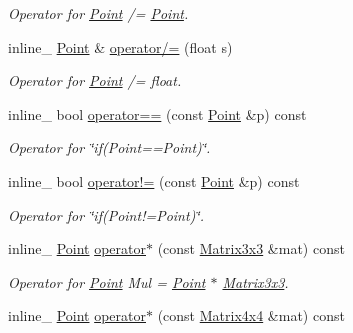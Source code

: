 \begin{DoxyCompactItemize}
\begin{DoxyCompactList}\small\item\em Operator for \hyperlink{classOpcode_1_1Point}{Point} /= \hyperlink{classOpcode_1_1Point}{Point}. \end{DoxyCompactList}\item 
inline\+\_\+ \hyperlink{classOpcode_1_1Point}{Point} \& \hyperlink{classOpcode_1_1Point_aedd8834fe4a31c357222a9d4d7bb98d9}{operator/=} (float s)\hypertarget{classOpcode_1_1Point_aedd8834fe4a31c357222a9d4d7bb98d9}{}\label{classOpcode_1_1Point_aedd8834fe4a31c357222a9d4d7bb98d9}

\begin{DoxyCompactList}\small\item\em Operator for \hyperlink{classOpcode_1_1Point}{Point} /= float. \end{DoxyCompactList}\item 
inline\+\_\+ bool \hyperlink{classOpcode_1_1Point_a58a4ef656e356333d2ffe0b18e836265}{operator==} (const \hyperlink{classOpcode_1_1Point}{Point} \&p) const \hypertarget{classOpcode_1_1Point_a58a4ef656e356333d2ffe0b18e836265}{}\label{classOpcode_1_1Point_a58a4ef656e356333d2ffe0b18e836265}

\begin{DoxyCompactList}\small\item\em Operator for \char`\"{}if(\+Point==\+Point)\char`\"{}. \end{DoxyCompactList}\item 
inline\+\_\+ bool \hyperlink{classOpcode_1_1Point_afd40a56c42541f9d67449cde0b659e8f}{operator!=} (const \hyperlink{classOpcode_1_1Point}{Point} \&p) const \hypertarget{classOpcode_1_1Point_afd40a56c42541f9d67449cde0b659e8f}{}\label{classOpcode_1_1Point_afd40a56c42541f9d67449cde0b659e8f}

\begin{DoxyCompactList}\small\item\em Operator for \char`\"{}if(\+Point!=\+Point)\char`\"{}. \end{DoxyCompactList}\item 
inline\+\_\+ \hyperlink{classOpcode_1_1Point}{Point} \hyperlink{classOpcode_1_1Point_aa945d324610c2bd6288ccad73dab90ca}{operator$\ast$} (const \hyperlink{classOpcode_1_1Matrix3x3}{Matrix3x3} \&mat) const \hypertarget{classOpcode_1_1Point_aa945d324610c2bd6288ccad73dab90ca}{}\label{classOpcode_1_1Point_aa945d324610c2bd6288ccad73dab90ca}

\begin{DoxyCompactList}\small\item\em Operator for \hyperlink{classOpcode_1_1Point}{Point} Mul = \hyperlink{classOpcode_1_1Point}{Point} $\ast$ \hyperlink{classOpcode_1_1Matrix3x3}{Matrix3x3}. \end{DoxyCompactList}\item 
inline\+\_\+ \hyperlink{classOpcode_1_1Point}{Point} \hyperlink{classOpcode_1_1Point_a86bdcf2f8f46addaa1eca5007bd343a6}{operator$\ast$} (const \hyperlink{classOpcode_1_1Matrix4x4}{Matrix4x4} \&mat) const \hypertarget{classOpcode_1_1Point_a86bdcf2f8f46addaa1eca5007bd343a6}{}\label{classOpcode_1_1Point_a86bdcf2f8f46addaa1eca5007bd343a6}


\end{DoxyCompactItemize}
